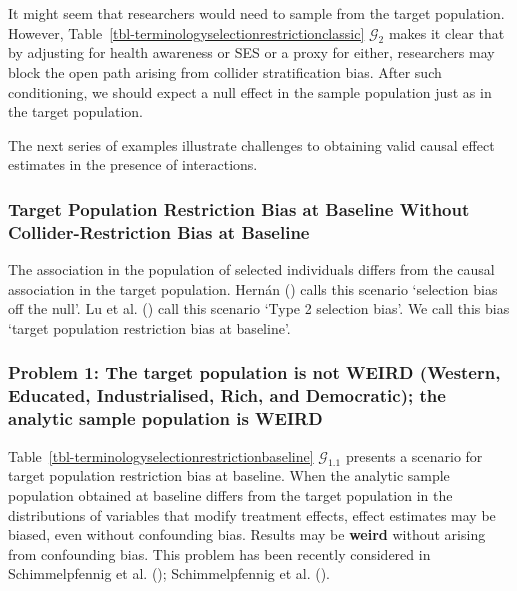 \documentclass[
  single column]{article}
\begin{document}
It might seem that researchers would need to sample from the target
population. However,
Table~\ref{tbl-terminologyselectionrestrictionclassic} \(\mathcal{G}_2\)
makes it clear that by adjusting for health awareness or SES or a proxy
for either, researchers may block the open path arising from collider
stratification bias. After such conditioning, we should expect a null
effect in the sample population just as in the target population.

The next series of examples illustrate challenges to obtaining valid
causal effect estimates in the presence of interactions.

\subsubsection{Target Population Restriction Bias at Baseline Without
Collider-Restriction Bias at
Baseline}\label{target-population-restriction-bias-at-baseline-without-collider-restriction-bias-at-baseline}

\begin{table}

\caption{\label{tbl-terminologyselectionrestrictionbaseline}The
association in the population of selected individuals differs from the
causal association in the target population. Hernán
() calls this
scenario `selection bias off the null'. Lu et al.
() call this scenario `Type 2 selection
bias'. We call this bias `target population restriction bias at
baseline'.}

\centering{

\terminologyselectionrestrictionbaseline

}

\end{table}%

\subsubsection{Problem 1: The target population is not WEIRD (Western,
Educated, Industrialised, Rich, and Democratic); the analytic sample
population is
WEIRD}\label{problem-1-the-target-population-is-not-weird-western-educated-industrialised-rich-and-democratic-the-analytic-sample-population-is-weird}

Table~\ref{tbl-terminologyselectionrestrictionbaseline}
\(\mathcal{G}_{1.1}\) presents a scenario for target population
restriction bias at baseline. When the analytic sample population
obtained at baseline differs from the target population in the
distributions of variables that modify treatment effects, effect
estimates may be biased, even without confounding bias. Results may be
\textbf{weird} without arising from confounding bias. This problem has
been recently considered in Schimmelpfennig et al.
(); Schimmelpfennig et
al. ().
\end{document}
